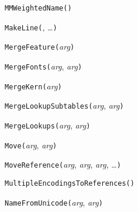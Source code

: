 

\texttt{MMWeightedName(}\texttt{)}



\texttt{MakeLine(}, \ldots\texttt{)}



\texttt{MergeFeature(}\textit{arg}\texttt{)}



\texttt{MergeFonts(}\textit{arg}, \textit{arg}\texttt{)}



\texttt{MergeKern(}\textit{arg}\texttt{)}



\texttt{MergeLookupSubtables(}\textit{arg}, \textit{arg}\texttt{)}



\texttt{MergeLookups(}\textit{arg}, \textit{arg}\texttt{)}



\texttt{Move(}\textit{arg}, \textit{arg}\texttt{)}



\texttt{MoveReference(}\textit{arg}, \textit{arg}, \textit{arg}, \ldots\texttt{)}



\texttt{MultipleEncodingsToReferences(}\texttt{)}



\texttt{NameFromUnicode(}\textit{arg}, \textit{arg}\texttt{)}

